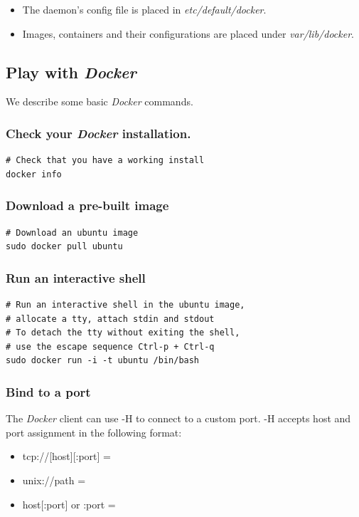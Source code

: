 \documentclass[captions=tableheading]{article}
\begin{document}
\begin{itemize}
\item The daemon's config file is placed in \emph{etc/default/docker}.
\item Images, containers and their configurations are placed under \emph{var/lib/docker}.
\end{itemize}
\subsection{Play with \emph{Docker}}
\label{sec-2-2}

We describe some basic \emph{Docker} commands.
\subsubsection{Check your \emph{Docker} installation.}
\label{sec-2-2-1}


\begin{verbatim}
# Check that you have a working install
docker info
\end{verbatim}
\subsubsection{Download a pre-built image}
\label{sec-2-2-2}


\begin{verbatim}
# Download an ubuntu image
sudo docker pull ubuntu
\end{verbatim}
\subsubsection{Run an interactive shell}
\label{sec-2-2-3}


\begin{verbatim}
# Run an interactive shell in the ubuntu image,
# allocate a tty, attach stdin and stdout
# To detach the tty without exiting the shell,
# use the escape sequence Ctrl-p + Ctrl-q
sudo docker run -i -t ubuntu /bin/bash
\end{verbatim}
\subsubsection{Bind to a port}
\label{sec-2-2-4}

The \emph{Docker} client can use -H to connect to a custom port.
-H accepts host and port assignment in the following format: 
\begin{itemize}
\item tcp://[host][:port]  =
\item unix://path =
\item host[:port] or :port =
\end{itemize}
\end{document}
